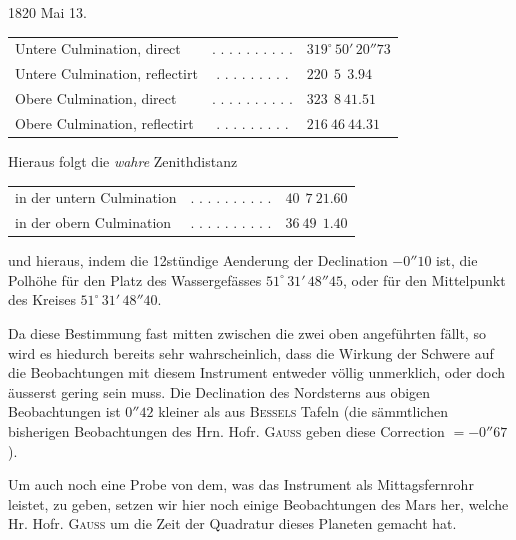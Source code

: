 \begin{center}
1820 Mai 13.
\end{center}

\begin{center}
\begin{tabular}{l c l}
Untere Culmination, direct & . . . . . . . . . . & $319^\circ\,50'\,20''\!73$ \\
Untere Culmination, reflectirt & . . . . . . . . . & $220\ \ 5\ \ 3.94$ \\
Obere Culmination, direct & . . . . . . . . . . & $323\ \ 8\ 41.51$ \\
Obere Culmination, reflectirt & . . . . . . . . . & $216\ 46\ 44.31$ \\
\end{tabular}
\end{center}

\begin{center}
Hieraus folgt die \textit{wahre} Zenithdistanz
\end{center}

\begin{center}
\begin{tabular}{l c l}
in der untern Culmination & . . . . . . . . . . & $40\ \ 7\ 21.60$ \\
in der obern Culmination & . . . . . . . . . . & $36\ 49\ \ 1.40$ \\
\end{tabular}
\end{center}

\noindent und hieraus, indem die 12stündige Aenderung der Declination $-0''10$ ist, die Polhöhe für den
Platz des Wassergefässes $51^\circ\,31'\,48''\!45$, oder für den Mittelpunkt des Kreises
$51^\circ\,31'\,48''\!40$.

\par\indent Da diese Bestimmung fast mitten zwischen die zwei oben angeführten fällt, so wird es hiedurch
bereits sehr wahrscheinlich, dass die Wirkung der Schwere auf die Beobachtungen mit diesem
Instrument entweder völlig unmerklich, oder doch äusserst gering sein muss. Die Declination des
Nordsterns aus obigen Beobachtungen ist $0''42$ kleiner als aus \textsc{Bessels} Tafeln (die
sämmtlichen bisherigen Beobachtungen des Hrn. Hofr. \textsc{Gauss} geben diese Correction $=
-0''67$).

Um auch noch eine Probe von dem, was das Instrument als Mittagsfernrohr leistet, zu geben, setzen
wir hier noch einige Beobachtungen des Mars her, welche Hr. Hofr. \textsc{Gauss} um die Zeit der
Quadratur dieses Planeten gemacht hat.

